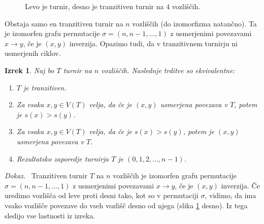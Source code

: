\documentclass[a4paper, 12pt]{book}
\newtheorem{izrek}{Izrek}[chapter]
\newenvironment{dokaz}{\emph{Dokaz.}\ }{\hspace{\fill}{$\Box$}}
\begin{document}
\begin{figure}[h]
    \begin{center}        
    \end{center}
    \caption{Levo je turnir, desno je tranzitiven turnir na $4$ vozliščih.}
    \label{graf_turnirja_in_tranzitivnega_turnirja}
\end{figure}

Obstaja samo en tranzitiven turnir na $n$ vozliščih (do izomorfizma natančno). Ta je izomorfen grafu permutacije $\sigma = (n, n-1, \dots, 1)$ z usmerjenimi povezavami $x \rightarrow y$, če je $(x, y)$ inverzija. Opazimo tudi, da v tranzitivnem turnirju ni usmerjenih ciklov. 

\begin{izrek}
\label{izrek_tranzitiven_turnir}
    Naj bo $T$ turnir na $n$ vozliščih. Naslednje trditve so ekvivalentne:
    \begin{enumerate}
        \item $T$ je tranzitiven.
        \item Za vsaka $x,y \in V(T)$ velja, da če je $(x, y)$ usmerjena povezava v $T$, potem je $s(x) > s(y)$.
        \item Za vsaka $x,y \in V(T)$  velja, da če je $s(x) > s(y)$, potem je $(x, y)$ usmerjena povezava v $T$.
        \item Rezultatsko zaporedje turnirja $T$ je $(0, 1, 2, \dots, n-1)$.
    \end{enumerate}
\end{izrek}
\begin{dokaz}
    Tranzitiven turnir $T$ na $n$ vozliščih je izomorfen grafu permutacije $\sigma = (n, n-1, \dots, 1)$ z usmerjenimi povezavami $x \rightarrow y$, če je $(x, y)$ inverzija. Če uredimo vozlišča od leve proti desni tako, kot so v permutaciji $\sigma$, vidimo, da ima vsako vozlišče povezave do vseh vozlišč desno od njega (slika \ref{graf_turnirja_in_tranzitivnega_turnirja} desno). Iz tega sledijo vse lastnosti iz izreka.
\end{dokaz}
\end{document}
